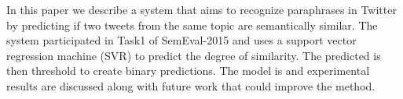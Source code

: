 In this paper we describe a system that aims to recognize paraphrases in Twitter by predicting if two tweets from the same topic are semantically similar. The system participated in Task1 of SemEval-2015 and uses a support vector regression machine (SVR) to predict the degree of similarity. The predicted is then threshold to create binary predictions. The model is and experimental results are discussed along with future work that could improve the method.
